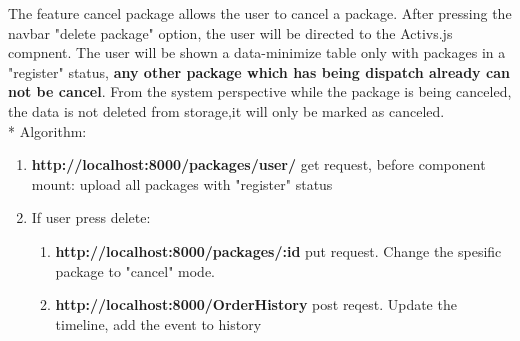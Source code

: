 The feature cancel package allows the user to cancel a package.
After pressing the navbar "delete package" option, the user will be directed to the Activs.js compnent.\newline
The user will be shown a data-minimize table only with packages in a "register" status, \textbf{any other package which has being dispatch already can not be cancel}.\newline
From the system perspective while the package is being canceled, the data is not deleted from storage,it will only be marked as canceled.\\*
Algorithm:
\begin{enumerate}
  \item \textbf{http://localhost:8000/packages/user/}  get request, before component mount: upload all packages with "register" status
  \item If user press delete:
  \begin{enumerate}
      \item \textbf {http://localhost:8000/packages/:id}  put request. Change the spesific package to "cancel" mode.
      \item \textbf {http://localhost:8000/OrderHistory}  post reqest. Update the timeline, add the event to history
\end{enumerate}
\end{enumerate}


